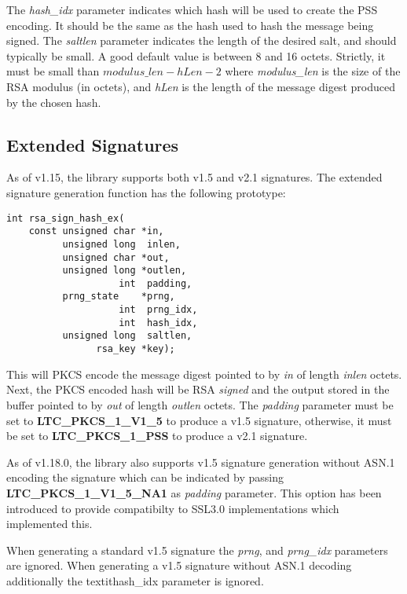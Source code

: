 \documentclass[synpaper]{book}
\begin{document}
The \textit{hash\_idx} parameter indicates which hash will be used to create the PSS encoding.  It should be the same as the hash used to
hash the message being signed.  The \textit{saltlen} parameter indicates the length of the desired salt, and should typically be small.  A good
default value is between 8 and 16 octets.  Strictly, it must be small than $modulus\_len - hLen - 2$ where \textit{modulus\_len} is the size of
the RSA modulus (in octets), and \textit{hLen} is the length of the message digest produced by the chosen hash.

\subsection{Extended Signatures}

As of v1.15, the library supports both v1.5 and v2.1 signatures.  The extended signature generation function has the following prototype:

\begin{verbatim}
int rsa_sign_hash_ex(
    const unsigned char *in,
          unsigned long  inlen,
          unsigned char *out,
          unsigned long *outlen,
                    int  padding,
          prng_state    *prng,
                    int  prng_idx,
                    int  hash_idx,
          unsigned long  saltlen,
                rsa_key *key);
\end{verbatim}

This will PKCS encode the message digest pointed to by \textit{in} of length \textit{inlen} octets.  Next, the PKCS encoded hash will be RSA
\textit{signed} and the output stored in the buffer pointed to by \textit{out} of length \textit{outlen} octets.  The \textit{padding} parameter
must be set to \textbf{LTC\_PKCS\_1\_V1\_5} to produce a v1.5 signature, otherwise, it must be set to \textbf{LTC\_PKCS\_1\_PSS} to produce a
v2.1 signature.

As of v1.18.0, the library also supports v1.5 signature generation without ASN.1 encoding the signature which can be indicated by passing
\textbf{LTC\_PKCS\_1\_V1\_5\_NA1} as \textit{padding} parameter. This option has been introduced to provide compatibilty to SSL3.0 implementations
which implemented this.

When generating a standard v1.5 signature the \textit{prng}, and \textit{prng\_idx} parameters are ignored.
When generating a v1.5 signature without ASN.1 decoding additionally the textit{hash\_idx} parameter is ignored.
\end{document}
